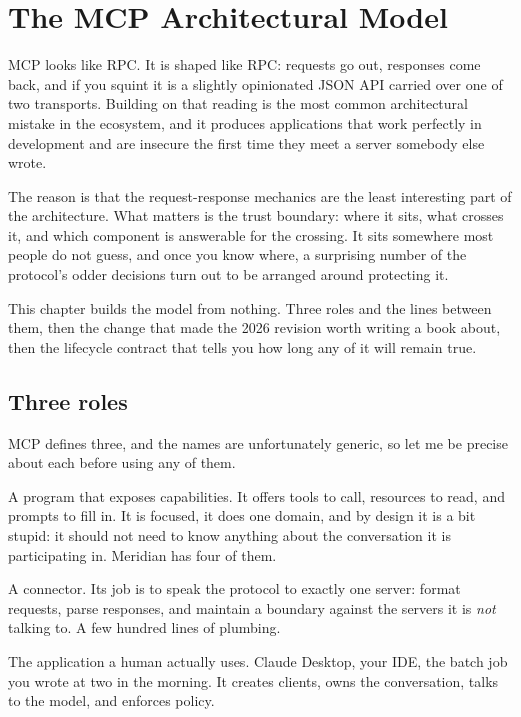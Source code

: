 \chapter{The MCP Architectural Model}
\label{ch:architecture}

MCP looks like RPC. It is shaped like RPC: requests go out, responses come back,
and if you squint it is a slightly opinionated JSON API carried over one of two
transports. Building on that reading is the most common architectural mistake in
the ecosystem, and it produces applications that work perfectly in development
and are insecure the first time they meet a server somebody else wrote.

The reason is that the request-response mechanics are the least interesting part
of the architecture. What matters is the trust boundary: where it sits, what
crosses it, and which component is answerable for the crossing. It sits
somewhere most people do not guess, and once you know where, a surprising number
of the protocol's odder decisions turn out to be arranged around protecting it.

This chapter builds the model from nothing. Three roles and the lines between
them, then the change that made the 2026 revision worth writing a book about,
then the lifecycle contract that tells you how long any of it will remain true.

\section{Three roles}

MCP defines three, and the names are unfortunately generic, so let me be precise
about each before using any of them.

\begin{description}[leftmargin=1.4em, style=nextline, itemsep=6pt]

\item[Server] A program that exposes capabilities. It offers tools to call,
resources to read, and prompts to fill in. It is focused, it does one domain,
and by design it is a bit stupid: it should not need to know anything about the
conversation it is participating in. Meridian has four of them.

\item[Client] A connector. Its job is to speak the protocol to exactly one
server: format requests, parse responses, and maintain a boundary against the
servers it is \emph{not} talking to. A few hundred lines of plumbing.

\item[Host] The application a human actually uses. Claude Desktop, your IDE, the
batch job you wrote at two in the morning. It creates clients, owns the
conversation, talks to the model, and enforces policy.

\end{description}

